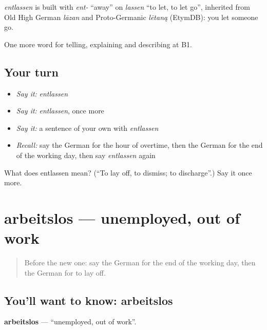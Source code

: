 \begin{cousinweb}
\emph{entlassen} is built with \emph{ent-} \textquotedblleft{}away\textquotedblright{} on \emph{lassen} \textquotedblleft{}to let, to let go\textquotedblright{}, inherited from Old High German \emph{lāzan} and Proto-Germanic \emph{lētaną} (EtymDB): you let someone go.
\end{cousinweb}

\begin{grammarlens}[title={What you've built}]
One more word for telling, explaining and describing at B1.
\end{grammarlens}

\subsection*{Your turn}
\begin{itemize}
\raggedright
  \item \emph{Say it:} \emph{entlassen}
  \item \emph{Say it:} \emph{entlassen}, once more
  \item \emph{Say it:} a sentence of your own with \emph{entlassen}
  \item \emph{Recall:} say the German for the hour of overtime, then the German for the end of the working day, then say \emph{entlassen} again
\end{itemize}

\begin{tcolorbox}[breakable,colback=teal!4,colframe=teal!35!black,title={Before you move on}]
What does entlassen mean? (\textquotedblleft{}To lay off, to dismiss; to discharge\textquotedblright{}.) Say it once more.
\end{tcolorbox}
\section[arbeitslos]{arbeitslos — unemployed, out of work}

\label{lesson:GE-C352-arbeitslos}



\begin{quote}
Before the new one: say the German for the end of the working day, then the German for to lay off.
\end{quote}

\subsection*{You'll want to know: arbeitslos}
\textbf{arbeitslos} — \textquotedblleft{}unemployed, out of work\textquotedblright{}.

